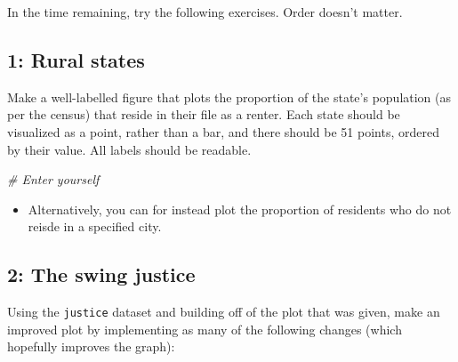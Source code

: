 \documentclass[]{book}
\newenvironment{Shaded}{\begin{snugshade}}{\end{snugshade}}
\newcommand{\CommentTok}[1]{\textcolor[rgb]{0.56,0.35,0.01}{\textit{#1}}}
\providecommand{\tightlist}{%
  \setlength{\itemsep}{0pt}\setlength{\parskip}{0pt}}
\theoremstyle{definition}
\theoremstyle{definition}
\theoremstyle{definition}
\theoremstyle{remark}
\begin{document}
In the time remaining, try the following exercises. Order doesn't matter.

\hypertarget{rural-states}{%
\subsection*{1: Rural states}\label{rural-states}}

Make a well-labelled figure that plots the proportion of the state's population (as per the census) that reside in their file as a renter. Each state should be visualized as a point, rather than a bar, and there should be 51 points, ordered by their value. All labels should be readable.

\begin{Shaded}
\begin{Highlighting}[]
\CommentTok{# Enter yourself}
\end{Highlighting}
\end{Shaded}

\begin{itemize}
\tightlist
\item
  Alternatively, you can for instead plot the proportion of residents who do not reisde in a specified city.
\end{itemize}

\hypertarget{the-swing-justice}{%
\subsection*{2: The swing justice}\label{the-swing-justice}}

Using the \texttt{justice} dataset and building off of the plot that was given, make an improved plot by implementing as many of the following changes (which hopefully improves the graph):
\end{document}
